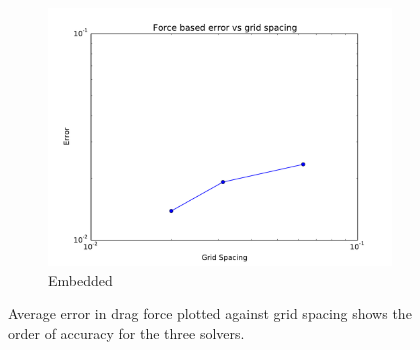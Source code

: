 \documentclass[onehalf,11pt]{beavtex}
\begin{document}
\begin{figure}[htb]
\begin{subfigure}{0.3\textwidth}
		\includegraphics[width=\linewidth]{error_embedded}
		\caption{Embedded}
	\end{subfigure}
	\caption{Average error in drag force plotted against grid spacing shows the order of accuracy for the three solvers.}
	\label{fig:cyerror}
\end{figure}
\end{document}
